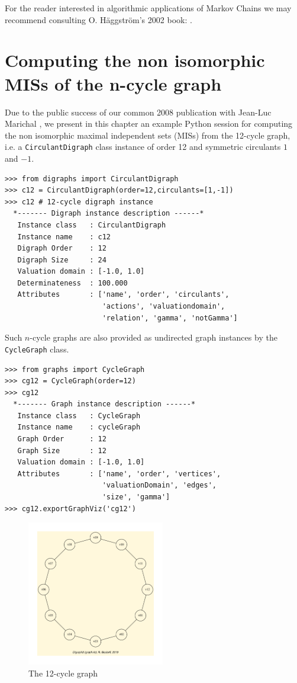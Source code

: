 For the reader interested in algorithmic applications of Markov Chains we may recommend consulting O. Häggström's 2002 book: \citep{FMCAA}.

\section[The n-cycle graph]{Computing the non isomorphic MISs of the n-cycle graph}
\label{sec:21.7}

Due to the public success of our common 2008 publication with Jean-Luc Marichal \citep{ISOMIS-08} , we present in this chapter an example Python session for computing the non isomorphic maximal independent sets (MISs) from the 12-cycle graph, i.e. a \texttt{CirculantDigraph} class instance of order 12 and symmetric circulants $1$ and $-1$.
\begin{lstlisting}
>>> from digraphs import CirculantDigraph
>>> c12 = CirculantDigraph(order=12,circulants=[1,-1])
>>> c12 # 12-cycle digraph instance
  *------- Digraph instance description ------*
   Instance class   : CirculantDigraph
   Instance name    : c12
   Digraph Order    : 12
   Digraph Size     : 24
   Valuation domain : [-1.0, 1.0]
   Determinateness  : 100.000
   Attributes       : ['name', 'order', 'circulants',
                       'actions', 'valuationdomain',
                       'relation', 'gamma', 'notGamma']
\end{lstlisting}

Such $n$-cycle graphs are also provided as undirected graph instances by the \texttt{CycleGraph} class.
\begin{lstlisting}
>>> from graphs import CycleGraph
>>> cg12 = CycleGraph(order=12)
>>> cg12
  *------- Graph instance description ------*
   Instance class   : CycleGraph
   Instance name    : cycleGraph
   Graph Order      : 12
   Graph Size       : 12
   Valuation domain : [-1.0, 1.0]
   Attributes       : ['name', 'order', 'vertices',
                       'valuationDomain', 'edges',
                       'size', 'gamma']
>>> cg12.exportGraphViz('cg12')
\end{lstlisting}
\begin{figure}[h]
\sidecaption[t]
\includegraphics[width=6cm]{Figures/cg12.pdf}
\caption{The 12-cycle graph} 
\label{fig:21.7.1}       %
\end{figure}

